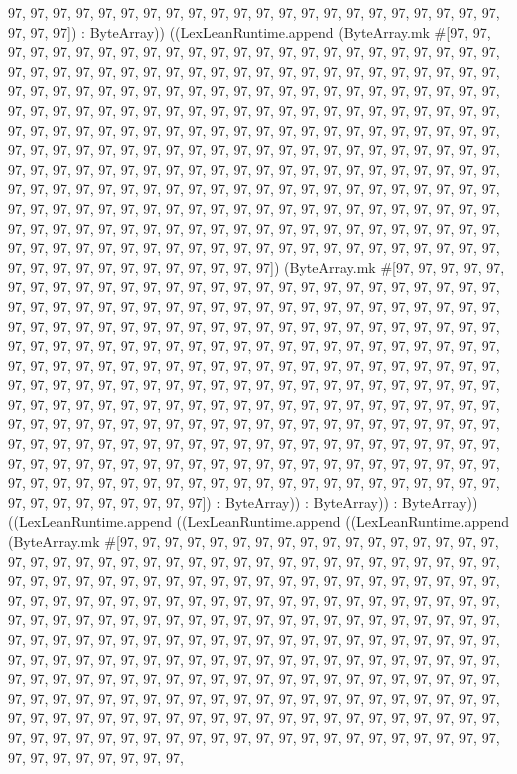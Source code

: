 \documentclass[11pt]{article}
\begin{document}
97, 97, 97, 97, 97, 97, 97, 97, 97, 97, 97, 97, 97, 97, 97, 97, 97, 97, 97, 97, 97, 97, 97, 97, 97]) : ByteArray)) ((LexLeanRuntime.append (ByteArray.mk \#[97, 97, 97, 97, 97, 97, 97, 97, 97, 97, 97, 97, 97, 97, 97, 97, 97, 97, 97, 97, 97, 97, 97, 97, 97, 97, 97, 97, 97, 97, 97, 97, 97, 97, 97, 97, 97, 97, 97, 97, 97, 97, 97, 97, 97, 97, 97, 97, 97, 97, 97, 97, 97, 97, 97, 97, 97, 97, 97, 97, 97, 97, 97, 97, 97, 97, 97, 97, 97, 97, 97, 97, 97, 97, 97, 97, 97, 97, 97, 97, 97, 97, 97, 97, 97, 97, 97, 97, 97, 97, 97, 97, 97, 97, 97, 97, 97, 97, 97, 97, 97, 97, 97, 97, 97, 97, 97, 97, 97, 97, 97, 97, 97, 97, 97, 97, 97, 97, 97, 97, 97, 97, 97, 97, 97, 97, 97, 97, 97, 97, 97, 97, 97, 97, 97, 97, 97, 97, 97, 97, 97, 97, 97, 97, 97, 97, 97, 97, 97, 97, 97, 97, 97, 97, 97, 97, 97, 97, 97, 97, 97, 97, 97, 97, 97, 97, 97, 97, 97, 97, 97, 97, 97, 97, 97, 97, 97, 97, 97, 97, 97, 97, 97, 97, 97, 97, 97, 97, 97, 97, 97, 97, 97, 97, 97, 97, 97, 97, 97, 97, 97, 97, 97, 97, 97, 97, 97, 97, 97, 97, 97, 97, 97, 97, 97, 97, 97, 97, 97, 97, 97, 97, 97, 97, 97, 97, 97, 97, 97, 97, 97, 97, 97, 97, 97, 97, 97, 97, 97, 97, 97, 97, 97, 97, 97, 97, 97, 97, 97, 97, 97, 97, 97, 97, 97, 97]) (ByteArray.mk \#[97, 97, 97, 97, 97, 97, 97, 97, 97, 97, 97, 97, 97, 97, 97, 97, 97, 97, 97, 97, 97, 97, 97, 97, 97, 97, 97, 97, 97, 97, 97, 97, 97, 97, 97, 97, 97, 97, 97, 97, 97, 97, 97, 97, 97, 97, 97, 97, 97, 97, 97, 97, 97, 97, 97, 97, 97, 97, 97, 97, 97, 97, 97, 97, 97, 97, 97, 97, 97, 97, 97, 97, 97, 97, 97, 97, 97, 97, 97, 97, 97, 97, 97, 97, 97, 97, 97, 97, 97, 97, 97, 97, 97, 97, 97, 97, 97, 97, 97, 97, 97, 97, 97, 97, 97, 97, 97, 97, 97, 97, 97, 97, 97, 97, 97, 97, 97, 97, 97, 97, 97, 97, 97, 97, 97, 97, 97, 97, 97, 97, 97, 97, 97, 97, 97, 97, 97, 97, 97, 97, 97, 97, 97, 97, 97, 97, 97, 97, 97, 97, 97, 97, 97, 97, 97, 97, 97, 97, 97, 97, 97, 97, 97, 97, 97, 97, 97, 97, 97, 97, 97, 97, 97, 97, 97, 97, 97, 97, 97, 97, 97, 97, 97, 97, 97, 97, 97, 97, 97, 97, 97, 97, 97, 97, 97, 97, 97, 97, 97, 97, 97, 97, 97, 97, 97, 97, 97, 97, 97, 97, 97, 97, 97, 97, 97, 97, 97, 97, 97, 97, 97, 97, 97, 97, 97, 97, 97, 97, 97, 97, 97, 97, 97, 97, 97, 97, 97, 97, 97, 97, 97, 97, 97, 97, 97, 97, 97, 97, 97, 97, 97, 97, 97, 97, 97, 97]) : ByteArray)) : ByteArray)) : ByteArray)) ((LexLeanRuntime.append ((LexLeanRuntime.append ((LexLeanRuntime.append (ByteArray.mk \#[97, 97, 97, 97, 97, 97, 97, 97, 97, 97, 97, 97, 97, 97, 97, 97, 97, 97, 97, 97, 97, 97, 97, 97, 97, 97, 97, 97, 97, 97, 97, 97, 97, 97, 97, 97, 97, 97, 97, 97, 97, 97, 97, 97, 97, 97, 97, 97, 97, 97, 97, 97, 97, 97, 97, 97, 97, 97, 97, 97, 97, 97, 97, 97, 97, 97, 97, 97, 97, 97, 97, 97, 97, 97, 97, 97, 97, 97, 97, 97, 97, 97, 97, 97, 97, 97, 97, 97, 97, 97, 97, 97, 97, 97, 97, 97, 97, 97, 97, 97, 97, 97, 97, 97, 97, 97, 97, 97, 97, 97, 97, 97, 97, 97, 97, 97, 97, 97, 97, 97, 97, 97, 97, 97, 97, 97, 97, 97, 97, 97, 97, 97, 97, 97, 97, 97, 97, 97, 97, 97, 97, 97, 97, 97, 97, 97, 97, 97, 97, 97, 97, 97, 97, 97, 97, 97, 97, 97, 97, 97, 97, 97, 97, 97, 97, 97, 97, 97, 97, 97, 97, 97, 97, 97, 97, 97, 97, 97, 97, 97, 97, 97, 97, 97, 97, 97, 97, 97, 97, 97, 97, 97, 97, 97, 97, 97, 97, 97, 97, 97, 97, 97, 97, 97, 97, 97, 97, 97, 97, 97, 97, 97, 97, 97, 97, 97, 97, 97, 97, 97, 97, 97, 97, 97, 97, 97, 97, 97, 97, 97, 97, 97, 97, 97, 97, 97, 97, 97, 97, 97, 97, 97, 97, 97, 97, 
\end{document}
